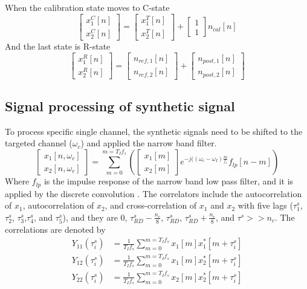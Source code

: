 When the calibration state moves to C-state
\begin{equation}
\begin{bmatrix}x^C_1[n] \\ x^C_2[n] \end{bmatrix} = 
\begin{bmatrix}x^T_1[n] \\ x^T_2[n] \end{bmatrix} +
\begin{bmatrix}1 \\ 1 \end{bmatrix}n_{cal}[n]
\end{equation}
And the last state is R-state
\begin{equation}
\begin{bmatrix}x^R_1[n] \\ x^R_2[n] \end{bmatrix} = 
\begin{bmatrix} n_{ref,1}[n] \\ n_{ref,2}[n] \end{bmatrix}  +
\begin{bmatrix} n_{post,1}[n] \\ n_{post,2}[n] \end{bmatrix} 
\end{equation}\subsection{Signal processing of synthetic signal}
To process specific single channel, the synthetic signals need to be shifted to the targeted channel ($\omega_c$) and applied the narrow band filter. 
\begin{equation}
\begin{bmatrix}x_1[n,\omega_c] \\ x_2[n,\omega_c] \end{bmatrix} = \sum_{m=0}^{m=T_I f_s} (
\begin{bmatrix}x_1[m] \\ x_2[m] \end{bmatrix} 
e^{-j ((\omega_{c} - \omega_I) \frac{m}{f_s}} f_{lp}[n-m])
\end{equation}
Where $f_{lp}$  is the impulse response of the narrow band low pass filter, and it is applied by the discrete convolution . The correlators include the autocorrelation of  $x_1$, autocorrelation of $x_2$, and cross-correlation of $x_1$ and $x_2$ with five lags ($\tau^s_1$, $\tau^s_2$, $\tau^s_3$,$\tau^s_4$, and $\tau^s_5$), and they are 0, $\tau^s_{RD} - \frac{n_c}{8}$,  $\tau^s_{RD} $, $\tau^s_{RD} +\frac{n_c}{8}$, and $\tau^s >> n_c$. The correlations are denoted by
\begin{align}
Y_{11}(\tau^s_i) &= \frac{1}{T_I f_s}\sum_{m=0}^{m=T_I f_s} x_1[m] x^*_1[m+\tau^s_i]  \\
Y_{12}(\tau^s_i) &=  \frac{1}{T_I f_s}\sum_{m=0}^{m=T_I f_s} x_1[m] x^*_2[m+\tau^s_i] \\
Y_{22}(\tau^s_i) &=  \frac{1}{T_I f_s}\sum_{m=0}^{m=T_I f_s} x_2[m] x^*_2[m+\tau^s_i]
\end{align}

